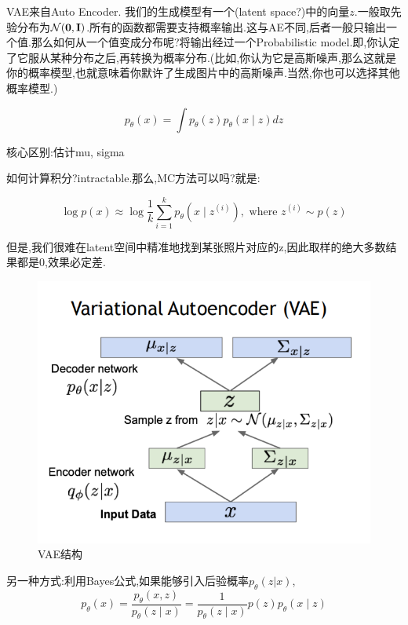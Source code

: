 	VAE来自Auto Encoder. 我们的生成模型有一个(latent space?)中的向量$z$.一般取先验分布为$\mathcal{N}(\boldsymbol 0, \bold{I})$.所有的函数都需要支持概率输出.这与AE不同,后者一般只输出一个值.那么如何从一个值变成分布呢?将输出经过一个Probabilistic model.即,你认定了它服从某种分布之后,再转换为概率分布.(比如,你认为它是高斯噪声,那么这就是你的概率模型,也就意味着你默许了生成图片中的高斯噪声.当然,你也可以选择其他概率模型.)
	
	\begin{equation}
		p_{\theta}(x)=\int p_{\theta}(z) p_{\theta}(x \mid z) d z  
	\end{equation}

	核心区别:估计mu, sigma
	
	如何计算积分?intractable.那么,MC方法可以吗?就是:
	
	\begin{equation}
		\log p(x) \approx \log \frac{1}{k} \sum_{i=1}^{k} p_{\theta}\left(x \mid z^{(i)}\right), \text { where } z^{(i)} \sim p(z)
	\end{equation}
	
	但是,我们很难在latent空间中精准地找到某张照片对应的z,因此取样的绝大多数结果都是0,效果必定差.
	
	\begin{figure}
		\includegraphics[scale=0.5]{figures/VAE_2.png}
		\caption{VAE结构}
	\end{figure}
	
	另一种方式:利用Bayes公式,如果能够引入后验概率$p_{\theta}(z|x)$,
	\begin{equation}
		p_{\theta}(x)=\frac{p_{\theta}(x, z)}{p_{\theta}(z \mid x)}=\frac{1}{p_{\theta}(z \mid x)} p(z) p_{\theta}(x \mid z)
	\end{equation}

